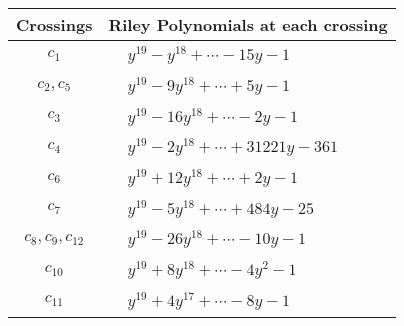 \documentclass[1p]{elsarticle_modified}
\theoremstyle{definition}
\begin{document}
\begin{tabular}{m{50pt}|m{274pt}}
Crossings & \hspace{64pt}Riley Polynomials at each crossing \\
\hline $$\begin{aligned}c_{1}\end{aligned}$$&$\begin{aligned}
&y^{19}- y^{18}+\cdots-15 y-1
\end{aligned}$\\
\hline $$\begin{aligned}c_{2},c_{5}\end{aligned}$$&$\begin{aligned}
&y^{19}-9 y^{18}+\cdots+5 y-1
\end{aligned}$\\
\hline $$\begin{aligned}c_{3}\end{aligned}$$&$\begin{aligned}
&y^{19}-16 y^{18}+\cdots-2 y-1
\end{aligned}$\\
\hline $$\begin{aligned}c_{4}\end{aligned}$$&$\begin{aligned}
&y^{19}-2 y^{18}+\cdots+31221 y-361
\end{aligned}$\\
\hline $$\begin{aligned}c_{6}\end{aligned}$$&$\begin{aligned}
&y^{19}+12 y^{18}+\cdots+2 y-1
\end{aligned}$\\
\hline $$\begin{aligned}c_{7}\end{aligned}$$&$\begin{aligned}
&y^{19}-5 y^{18}+\cdots+484 y-25
\end{aligned}$\\
\hline $$\begin{aligned}c_{8},c_{9},c_{12}\end{aligned}$$&$\begin{aligned}
&y^{19}-26 y^{18}+\cdots-10 y-1
\end{aligned}$\\
\hline $$\begin{aligned}c_{10}\end{aligned}$$&$\begin{aligned}
&y^{19}+8 y^{18}+\cdots-4 y^2-1
\end{aligned}$\\
\hline $$\begin{aligned}c_{11}\end{aligned}$$&$\begin{aligned}
&y^{19}+4 y^{17}+\cdots-8 y-1
\end{aligned}$\\
\hline
\end{tabular}\\~\\
\end{document}
